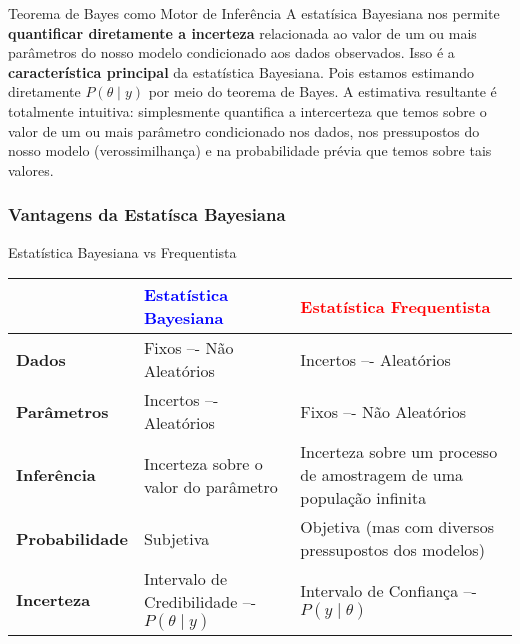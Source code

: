 \begin{frame}{Teorema de Bayes como Motor de Inferência}
	A estatísica Bayesiana nos permite \textbf{quantificar diretamente a incerteza}
	relacionada ao valor de um ou mais parâmetros do nosso modelo condicionado aos
	dados observados. Isso é a \textbf{característica principal} da estatística
	Bayesiana. Pois estamos estimando diretamente $P(\theta \mid y)$ por meio do
	teorema de Bayes. A estimativa resultante é totalmente intuitiva:
	simplesmente quantifica a intercerteza que temos sobre o valor de um ou mais
	parâmetro condicionado nos dados, nos pressupostos do nosso modelo
	(verossimilhança) e na probabilidade prévia que temos sobre tais valores.
\end{frame}

\subsubsection{Vantagens da Estatísca Bayesiana}
\begin{frame}{Estatística Bayesiana vs Frequentista}
	\small
	\begin{tabular}{|l|p{}|p{}|}
		\toprule
		                       & \textcolor{blue}{\textbf{Estatística Bayesiana}} & \textcolor{red}{\textbf{Estatística Frequentista}}                  \\ \midrule
		\textbf{Dados}         & Fixos –- Não Aleatórios                          & Incertos –- Aleatórios                                              \\ \midrule
		\textbf{Parâmetros}    & Incertos –- Aleatórios                           & Fixos –- Não Aleatórios                                             \\ \midrule
		\textbf{Inferência}    & Incerteza sobre o valor do parâmetro             & Incerteza sobre um processo de amostragem de uma população infinita \\ \midrule
		\textbf{Probabilidade} & Subjetiva                                        & Objetiva (mas com diversos pressupostos dos modelos)                \\ \midrule
		\textbf{Incerteza}     & Intervalo de Credibilidade –- $P(\theta \mid y)$ & Intervalo de Confiança –- $P(y \mid \theta)$                        \\
		\bottomrule
	\end{tabular}
\end{frame}

